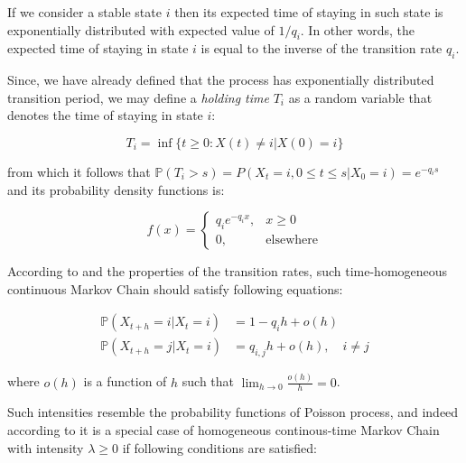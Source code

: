 If we consider a stable state $i$ then its expected time of staying in such state is exponentially 
distributed with expected value of $1/q_i$. In other words, the expected time of staying in state $i$ is equal 
to the inverse of the transition rate $q_i$. \citep{Norris2012}

Since, we have already defined that the process has exponentially distributed transition period, we may define a \textit{holding time} $T_i$ as a random variable that denotes the time of staying in state $i$:

\begin{equation}
T_i = \inf \{t \geq 0 : X(t) \neq i | X(0) = i\}
\end{equation}

from which it follows that $\mathbb{P}(T_i>s) = P(X_t=i,0 \leq t \leq s|X_0=i) = e^{-q_i s}$ and its probability density functions is:

\begin{equation}
    f(x) = 
    \begin{cases}
        q_i e^{-q_i x}, & x \geq 0\\
        0, & \text{elsewhere}
    \end{cases}
\end{equation}

According to \citep{Praskova2012} and the properties of the transition rates, such time-homogeneous continuous Markov Chain should satisfy following equations:

\begin{equation}
    \begin{aligned}
        \mathbb{P}(X_{t+h}=i|X_t=i) &= 1 - q_i h + o(h) \\
        \mathbb{P}(X_{t+h}=j|X_t=i) &= q_{i,j} h + o(h), \quad i \neq j
    \end{aligned}
\end{equation}

where $o(h)$ is a function of $h$ such that $\lim_{h \to 0} \frac{o(h)}{h} = 0$.

Such intensities resemble the probability functions of Poisson process, and indeed according to \citep{Norris2012} it is a special case of homogeneous continous-time Markov Chain with intensity $\lambda \geq 0$ if following conditions are satisfied:

